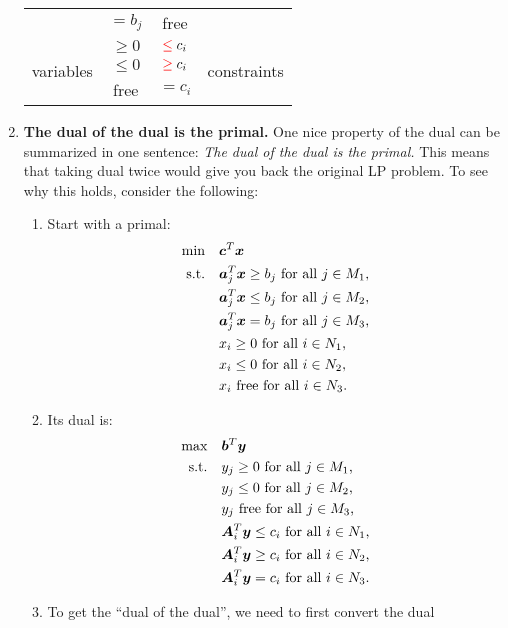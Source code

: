 \begin{enumerate}
\begin{center}
\begin{tabular}{cccc}
&\(=b_j\)&free& \\
\multirow{3}{*}{variables}&\(\ge 0\)&\(\rc{\le} c_i\)&\multirow{3}{*}{constraints} \\
&\(\le 0\)&\(\rc{\ge} c_i\)& \\
&free&\(=c_i\)& \\
\bottomrule
\end{tabular}
\end{center}
\item\label{it:dual-dual-primal} \textbf{The dual of the dual is the primal.}
One nice property of the dual can be summarized in one sentence: \emph{The dual
of the dual is the primal.} This means that taking dual twice would give you
back the original LP problem. To see why this holds, consider the following:
\begin{enumerate}[label={(\arabic*)}]
\item Start with a primal:
\begin{align*}
\text{min}\quad&\bm{c}^{T}\bm{x} \\
\text{s.t.}\quad&\bm{a}_j^{T}\bm{x}\ge b_j \text{ for all \(j\in M_1\),} \\
\quad&\bm{a}_j^{T}\bm{x}\le b_j \text{ for all \(j\in M_2\),} \\
\quad&\bm{a}_j^{T}\bm{x}=b_j \text{ for all \(j\in M_3\),} \\
\quad&x_i\ge 0\text{ for all \(i\in N_1\),} \\
\quad&x_i\le 0\text{ for all \(i\in N_2\),} \\
\quad&x_i\text{ free}\text{ for all \(i\in N_3\).}
\end{align*}
\item Its dual is:
\begin{align*}
\text{max}\quad&\bm{b}^{T}\bm{y} \\
\text{s.t.}\quad&y_j\ge 0 \text{ for all \(j\in M_1\),} \\
\quad&y_j\le 0 \text{ for all \(j\in M_2\),} \\
\quad&y_j\text{ free} \text{ for all \(j\in M_3\),} \\
\quad&\bm{A}_i^{T}\bm{y}\le c_i\text{ for all \(i\in N_1\),} \\
\quad&\bm{A}_i^{T}\bm{y}\ge c_i\text{ for all \(i\in N_2\),} \\
\quad&\bm{A}_i^{T}\bm{y}=c_i\text{ for all \(i\in N_3\).}
\end{align*}
\item To get the ``dual of the dual'', we need to first convert the dual

\end{enumerate}
\end{enumerate}

